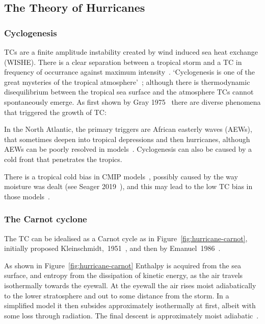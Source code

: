 
\subsection{The Theory of Hurricanes}
\label{sec:hurr-theory}

\subsubsection{Cyclogenesis}
\label{sec:cyclogenesis}
TCs are a finite amplitude instability created by
wind induced sea heat exchange (WISHE). There is
a clear separation between a tropical storm and a TC
in frequency of occurrance against maximum intensity~\cite{emanuel2005divine}.
`Cyclogenesis is one of the great mysteries of the tropical atmosphere'~\cite{emanuel2018progress};
although there is thermodynamic disequilibrium between the tropical sea
surface and the atmosphere TCs cannot spontaneously emerge. As first shown by
Gray 1975~\cite{gray1975tropical} there are
 diverse phenomena that triggered the growth of TC:

 In the North Atlantic, the primary triggers are African easterly waves (AEWs),
 that sometimes deepen into tropical depressions and then hurricanes,
 although AEWs can be poorly resolved in models~\cite{tomassini2017interaction}.
 Cyclogenesis can also be caused by a cold front that penetrates the tropics.

 There is a tropical cold bias in CMIP models~\cite{camargo2013global},
 possibly caused by the way moisture was dealt (see Seager 2019~\cite{seager2019strengthening}),
 and this may lead to the low TC bias in those models~\cite{tomassini2017interaction}.

\subsubsection{The Carnot cyclone}
\label{sec:carnot}

The TC can be idealised as a Carnot cycle as in Figure~\ref{fig:hurricane-carnot},
initially proposed Kleinschmidt,~1951~\cite{kleinschmidt1951grundlagen},
and then by Emanuel~1986~\cite{emanuel1986air, emanuel1987dependence, lilly1985steady,}.



As shown in Figure~\ref{fig:hurricane-carnot} Enthalpy is acquired from the sea surface,
and entropy from the dissipation of kinetic energy,
 as the air travels isothermally towards the eyewall.
 At the eyewall the air rises moist adiabatically
 to the lower stratosphere and out to some distance from the storm.
 In a simplified model it then subsides
 approximately isothermally at first, albeit with some loss through radiation.
 The final descent is approximately moist adiabatic~\cite{emanuel2018progress}.

